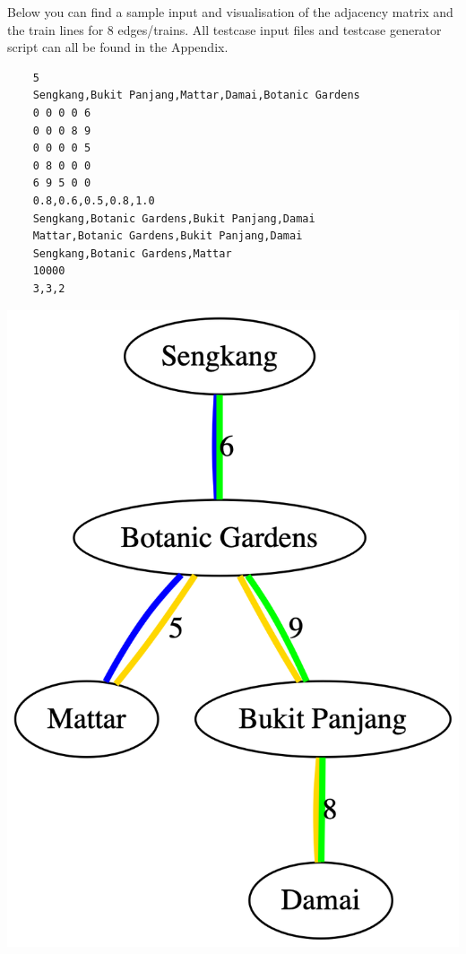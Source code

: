 \documentclass[a4paper,12pt]{article}
\begin{document}
Below you can find a sample input and visualisation of the adjacency matrix and the train lines for 8 edges/trains. All testcase input files and testcase generator script can all be found in the Appendix.

\begin{center}
	\begin{minipage}{.65\textwidth}
		\centering
		\begin{verbatim}
    5
    Sengkang,Bukit Panjang,Mattar,Damai,Botanic Gardens
    0 0 0 0 6
    0 0 0 8 9
    0 0 0 0 5
    0 8 0 0 0
    6 9 5 0 0
    0.8,0.6,0.5,0.8,1.0
    Sengkang,Botanic Gardens,Bukit Panjang,Damai
    Mattar,Botanic Gardens,Bukit Panjang,Damai
    Sengkang,Botanic Gardens,Mattar
    10000
    3,3,2
    \end{verbatim}
	\end{minipage}
	\begin{minipage}{0.33\textwidth}
		\centering
		\includegraphics[width=\linewidth]{map}
	\end{minipage}
\end{center}
\newpage
\end{document}
